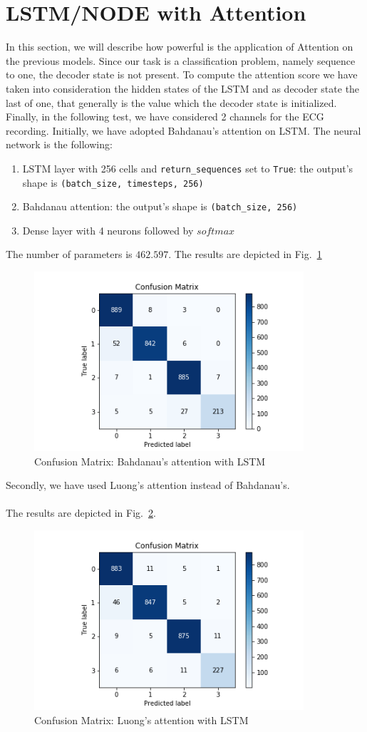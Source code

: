\documentclass[LaM,binding=0.6cm]{sapthesis}
\begin{document}
\section{LSTM/NODE with Attention}
In this section, we will describe how powerful is the application of Attention on the previous models. Since our task is a classification problem, namely sequence to one, the decoder state is not present. To compute the attention score we have taken into consideration the hidden states of the LSTM and as decoder state the last of one, that generally is the value which the decoder state is initialized. Finally, in the following test, we have considered 2 channels for the ECG recording. Initially, we have adopted Bahdanau's attention on LSTM. The neural network is the following:
\begin{enumerate}
\item LSTM layer with 256 cells and \texttt{return\_sequences} set to \texttt{True}: the output's shape is \texttt{(batch\_size, timesteps, 256)} 
\item Bahdanau attention: the output's shape is \texttt{(batch\_size, 256)} 
\item Dense layer with 4 neurons followed by $softmax$
\end{enumerate}
The number of parameters is $462.597$.
The results are depicted in Fig.~\ref{fig:lstmat1}
\begin{figure}  \centering
    \includegraphics[width=100mm,scale=0.7]{lstmat1}
    \caption{Confusion Matrix: Bahdanau's attention with LSTM}
    \label{fig:lstmat1}
\end{figure}
Secondly, we have used Luong's attention instead of Bahdanau's.\\\\The results are depicted in Fig.~\ref{fig:lstmat2}.
\begin{figure}  \centering
    \includegraphics[width=100mm,scale=0.7]{lstmat2}
    \caption{Confusion Matrix: Luong's attention with LSTM}
    \label{fig:lstmat2}
\end{figure}
\end{document}
